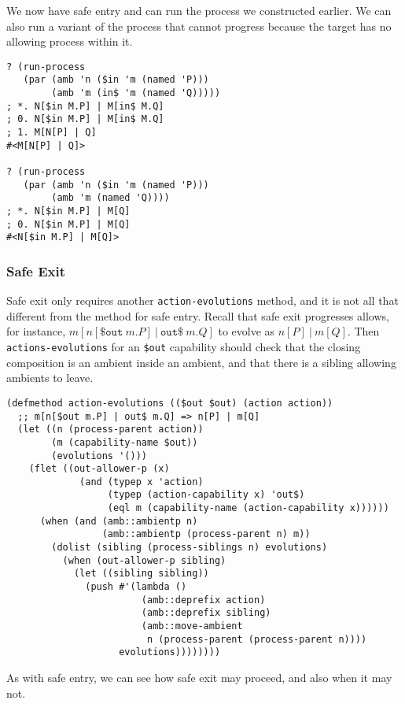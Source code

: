 \documentclass[12pt]{article}
\begin{document}
We now have safe entry and can run the process we constructed earlier.
We can also run a variant of the process that cannot progress because the target has no allowing process within it.

\begin{verbatim}
? (run-process 
   (par (amb 'n ($in 'm (named 'P)))
        (amb 'm (in$ 'm (named 'Q)))))
; *. N[$in M.P] | M[in$ M.Q]
; 0. N[$in M.P] | M[in$ M.Q]
; 1. M[N[P] | Q]
#<M[N[P] | Q]>

? (run-process 
   (par (amb 'n ($in 'm (named 'P)))
        (amb 'm (named 'Q))))
; *. N[$in M.P] | M[Q]
; 0. N[$in M.P] | M[Q]
#<N[$in M.P] | M[Q]>
\end{verbatim}

\subsubsection{Safe Exit}
\label{sec:safe-exit}

Safe exit only requires another \texttt{action-evolutions} method, and it is not all that different from the method for safe entry.
Recall that safe exit progresses allows, for instance, $m[n[\mathtt{\$out}\ m.P]\ |\ \mathtt{out\$}\ m.Q]$ to evolve as $n[P]\ |\ m[Q]$.
Then \texttt{actions-evolutions} for an \texttt{\$out} capability should check that the closing composition is an ambient inside an ambient, and that there is a sibling allowing ambients to leave.

\begin{verbatim}
(defmethod action-evolutions (($out $out) (action action))
  ;; m[n[$out m.P] | out$ m.Q] => n[P] | m[Q]
  (let ((n (process-parent action))
        (m (capability-name $out))
        (evolutions '()))
    (flet ((out-allower-p (x)
             (and (typep x 'action)
                  (typep (action-capability x) 'out$)
                  (eql m (capability-name (action-capability x))))))
      (when (and (amb::ambientp n)
                 (amb::ambientp (process-parent n) m))
        (dolist (sibling (process-siblings n) evolutions)
          (when (out-allower-p sibling)
            (let ((sibling sibling))
              (push #'(lambda ()
                        (amb::deprefix action)
                        (amb::deprefix sibling)
                        (amb::move-ambient
                         n (process-parent (process-parent n))))
                    evolutions))))))))
\end{verbatim}

As with safe entry, we can see how safe exit may proceed, and also when it may not.
\end{document}
